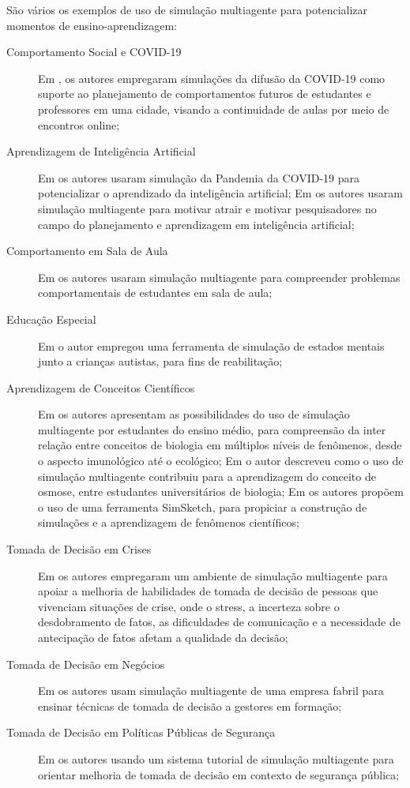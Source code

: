 São vários os exemplos de uso de simulação multiagente para potencializar momentos de ensino-aprendizagem:
\begin{description}
\item [Comportamento Social e COVID-19] Em \cite{santoro_building_2020}, os autores empregaram simulações da difusão da COVID-19 como suporte ao planejamento de comportamentos futuros de estudantes e professores em uma cidade, visando a continuidade de aulas por meio de encontros online; 
\item [Aprendizagem de Inteligência Artificial] Em \cite{juarez_analysis_2022} os autores usaram simulação da Pandemia da COVID-19 para potencializar o aprendizado da inteligência artificial; Em \cite{filho_proposal_2007} os autores usaram simulação multiagente para motivar atrair e motivar pesquisadores no campo do planejamento e aprendizagem em inteligência artificial;
\item [Comportamento em Sala de Aula] Em \cite{zhao_research_2011} os autores usaram simulação multiagente para compreender problemas comportamentais de estudantes em sala de aula;
\item [Educação Especial] Em \cite{galitsky_computational_2013} o autor empregou uma ferramenta de simulação de estados mentais junto a crianças autistas, para fins de reabilitação;
\item [Aprendizagem de Conceitos Científicos]
Em \cite{wilensky_thinking_2006} os autores apresentam as possibilidades do uso de simulação multiagente por estudantes do ensino médio, para compreensão da inter relação entre conceitos de biologia em múltiplos níveis de fenômenos, desde o aspecto imunológico até o ecológico; Em \cite{kottonau_interactive_2011} o autor descreveu como o uso de simulação multiagente contribuiu para a aprendizagem do conceito de osmose, entre estudantes universitários de biologia; Em \cite{bollen_simsketch_2013} os autores propõem o uso de uma ferramenta SimSketch, para propiciar a construção de simulações e a aprendizagem de fenômenos científicos;
\item [Tomada de Decisão em Crises] Em \cite{tena-chollet_design_2016} os autores empregaram um ambiente de simulação multiagente para apoiar a melhoria de habilidades de tomada de decisão de pessoas que vivenciam  situações de crise, onde o stress, a incerteza sobre o desdobramento de fatos, as dificuldades de comunicação e a necessidade de antecipação de fatos afetam a qualidade da decisão; 
\item [Tomada de Decisão em Negócios] Em \cite{hishiyama_business_2015} os autores usam simulação multiagente de uma empresa fabril para ensinar técnicas de tomada de decisão a gestores em formação; 
\item [Tomada de Decisão em Políticas Públicas de Segurança] Em \cite{furtado_multiagent_2006} os autores usando um sistema tutorial de simulação multiagente para orientar melhoria de tomada de decisão em contexto de segurança pública;
\end{description}


